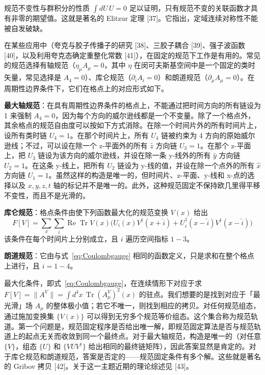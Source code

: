 规范不变性与群积分的性质 $\int dU\, U = 0$ 足以证明，只有规范不变的关联函数才具有非零的期望值。这就是著名的 Elitzur 定理 [37]。它指出，定域连续对称性不能被自发破缺。

在某些应用中（夸克与胶子传播子的研究 [38]、三胶子耦合 [39]、强子波函数 [40]，以及利用夸克态确定重整化常数 [41]），在固定的规范下工作是有用的。常见的规范选择有轴规范（$\eta_\mu A_\mu = 0$，其中 $\eta$ 在闵可夫斯基空间中是一个固定的类时矢量，常见选择是 $A_4 = 0$）、库仑规范（$\partial_i A_i = 0$）和朗道规范（$\partial_\mu A_\mu = 0$）。在周期性边界条件下，它们在格点上的对应形式如下。

\textbf{最大轴规范}：在具有周期性边界条件的格点上，不能通过把时间方向的所有链设为 1 来强制 $A_4 = 0$，因为每个方向的威尔逊线都是一个不变量。除了一个格点外，其余格点的规范自由度可以按如下方式消除。在除一个时间片外的所有时间片上，设所有类时链 $U_4 = 1$。在那个时间片上，所有 $U_4$ 链被约束为 4 方向的原始威尔逊线；不过，可以设在除一个 z-平面外的所有 $\hat{z}$ 方向链 $U_3 = 1$。在那个 z-平面上，把 $U_3$ 链设为该方向的威尔逊线，并设在除一条 y-线外的所有 $\hat{y}$ 方向链 $U_2 = 1$。在这条 y-线上，把所有 $U_2$ 链设为 y-线的值，并设在除一个点外的所有 $\hat{x}$ 方向链 $U_1 = 1$。虽然这样的构造是唯一的，但时间片、z-平面、y-线和 x-点的选择以及 $x,y,z,t$ 轴的标记并不是唯一的。此外，这种规范固定不保持欧几里得平移不变性，而且不是光滑的。

\textbf{库仑规范}：格点条件由使下列函数最大化的规范变换 $V(x)$ 给出
\begin{equation}
\label{eq:Coulombgauge}
F[V] = \sum_x\sum_i \operatorname{Re}\operatorname{Tr} V(x)
\bigg( U_i(x)V^\dagger(x+\hat{i}) +
       U_i^\dagger(x-\hat{i})V^\dagger(x-\hat{i}) \bigg)
\end{equation}
该条件在每个时间片上分别成立，且 $i$ 遍历空间指标 $1-3$。

\textbf{朗道规范}：它由与式~\ref{eq:Coulombgauge} 相同的函数定义，只是求和在整个格点上进行，且 $i = 1-4$。

最大化条件，即式~\ref{eq:Coulombgauge}，在连续情形下对应于求 $F[V] = \lVert A^V \rVert = \int d^4x\, \operatorname{Tr}(A_\mu^V)^2(x)$ 的驻点。我们想要的是找到对应于「最光滑」场 $A_\mu$ 的整体极小值；若它不唯一，则找到相应的拷贝。对任何规范组态，通过施加变换集 $\{V(x)\}$ 可以得到无穷多个规范等价组态。这个集合称为规范轨道。第一个问题是，规范固定程序是否给出唯一解，即规范固定算法是否与规范轨道上的起点无关而收敛到同一个最终点。对于最大轴规范，构造是唯一的（对任意 $\{V\}$，组态 $\{U\}$ 和 $\{VUV^\dagger\}$ 给出相同的最终链矩阵），因此答案显然是肯定的。对于库仑规范和朗道规范，答案是否定的——规范固定条件有多个解。这些就是著名的 Gribov 拷贝 [42]。关于这一主题近期的理论综述见 [43]。

